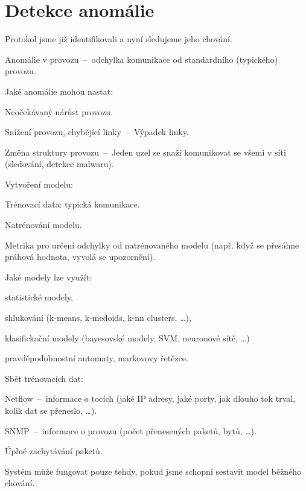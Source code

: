 
\section{Detekce anomálie}

\begin{compactitem}
    \item Protokol jsme již identifikovali a nyní sledujeme jeho chování.
    \item Anomálie v provozu~--~odchylka komunikace od standardního (typického) provozu.
    \item Jaké anomálie mohou nastat: \begin{compactitem}
        \item Neočekávaný nárůst provozu.
        \item Snížení provozu, chybějící linky~--~Výpadek linky.
        \item Změna struktury provozu~--~Jeden uzel se snaží komunikovat se všemi v síti (sledování, detekce malwaru).
    \end{compactitem}
    \item Vytvoření modelu: \begin{compactitem}
        \item Trénovací data: typická komunikace.
        \item Natrénování modelu.
        \item Metrika pro určení odchylky od natrénovaného modelu (např. když se přesáhne práhová hodnota, vyvolá se upozornění).
    \end{compactitem}
    \item Jaké modely lze využít: \begin{compactitem}
        \item statistické modely,
        \item shlukování (k-means, k-medoids, k-nn clusters, \dots),
        \item klasifickační modely (bayesovské modely, SVM, neuronové sítě, \dots)
        \item pravděpodobnostní automaty, markovovy řetězce.
    \end{compactitem}
    \item Sbět trénovacích dat: \begin{compactitem}
        \item Netflow~--~informace o tocích (jaké IP adresy, jaké porty, jak dlouho tok trval, kolik dat se přeneslo, \dots).
        \item SNMP~--~informace o provozu (počet přenesených paketů, bytů, \dots).
        \item Úplné zachytávání paketů.
    \end{compactitem}
    \item Systém může fungovat pouze tehdy, pokud jsme schopni sestavit model běžného chování.
\end{compactitem}
